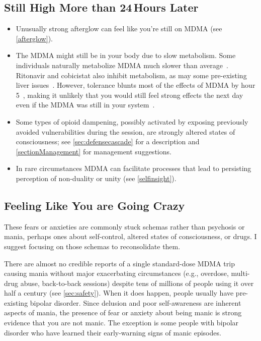 \documentclass[11pt,oneside]{book}
\let\cite\parencite
\begin{document}
\subsection{Still High More than 24\,Hours Later}
\begin{itemize}
    \item Unusually strong afterglow can feel like you're still on MDMA (see \cref{afterglow}).
    \item The MDMA might still be in your body due to slow metabolism. Some individuals naturally metabolize MDMA much slower than average~\cite{straumann2024racemic}. Ritonavir and cobicistat also inhibit metabolism, as may some pre-existing liver issues~\cite{sarparastDrugInteractions,bracchi2015antiretrovirals}. However, tolerance blunts most of the effects of MDMA by hour 5~\cite{straumann2024racemic}, making it unlikely that you would still feel strong effects the next day even if the MDMA was still in your system~\cite{farreTolerance,parrottTolerance}.
    \item Some types of opioid dampening, possibly activated by exposing previously avoided vulnerabilities during the session, are strongly altered states of consciousness; see \cref{sec:defensecascade} for a description and \cref{sectionManagement} for management suggestions.
    \item In rare circumstances MDMA can facilitate processes that lead to persisting perception of non-duality or unity (see \cref{selfinsight}).
\end{itemize}

\subsection{Feeling Like You are Going Crazy}
These fears or anxieties are commonly stuck schemas rather than psychosis or mania, perhaps ones about self-control, altered states of consciousness, or drugs. I suggest focusing on those schemas to reconsolidate them.

There are almost no credible reports of a single standard-dose MDMA trip causing mania without major exacerbating circumstances (e.g., overdose, multi-drug abuse, back-to-back sessions) despite tens of millions of people using it over half a century (see \cref{sec:safety}). When it does happen, people usually have pre-existing bipolar disorder. Since delusion and poor self-awareness are inherent aspects of mania, the presence of fear or anxiety about being manic is strong evidence that you are not manic. The exception is some people with bipolar disorder who have learned their early-warning signs of manic episodes.
\end{document}
